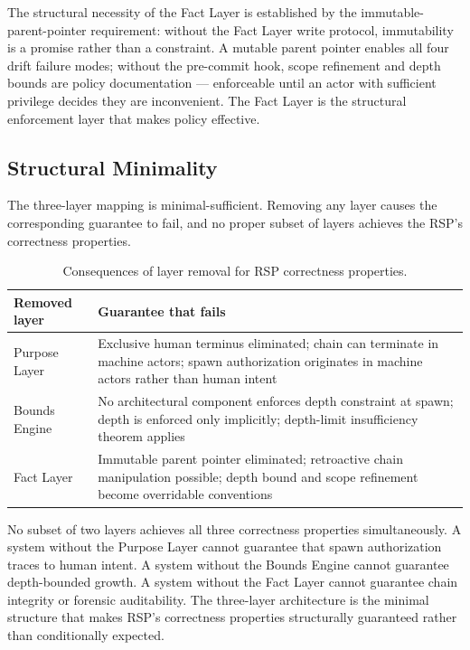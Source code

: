 The structural necessity of the Fact Layer is established by the immutable-parent-pointer requirement: without the Fact Layer write protocol, immutability is a promise rather than a constraint. A mutable parent pointer enables all four drift failure modes; without the pre-commit hook, scope refinement and depth bounds are policy documentation — enforceable until an actor with sufficient privilege decides they are inconvenient. The Fact Layer is the structural enforcement layer that makes policy effective.

\subsection{Structural Minimality}
\label{sec:rs-minimality}

The three-layer mapping is minimal-sufficient. Removing any layer causes the corresponding guarantee to fail, and no proper subset of layers achieves the RSP's correctness properties.

\begin{table}[h]
\centering
\begin{tabular}{p{3.0cm} p{5.5cm}}
\toprule
\textbf{Removed layer} & \textbf{Guarantee that fails} \\
\midrule
Purpose Layer        & Exclusive human terminus eliminated; chain can terminate in machine actors; spawn authorization originates in machine actors rather than human intent \\
Bounds Engine       & No architectural component enforces depth constraint at spawn; depth is enforced only implicitly; depth-limit insufficiency theorem applies \\
Fact Layer          & Immutable parent pointer eliminated; retroactive chain manipulation possible; depth bound and scope refinement become overridable conventions \\
\bottomrule
\end{tabular}
\caption{Consequences of layer removal for RSP correctness properties.}
\label{tab:layer-minimality}
\end{table}

No subset of two layers achieves all three correctness properties simultaneously. A system without the Purpose Layer cannot guarantee that spawn authorization traces to human intent. A system without the Bounds Engine cannot guarantee depth-bounded growth. A system without the Fact Layer cannot guarantee chain integrity or forensic auditability. The three-layer architecture is the minimal structure that makes RSP's correctness properties structurally guaranteed rather than conditionally expected.